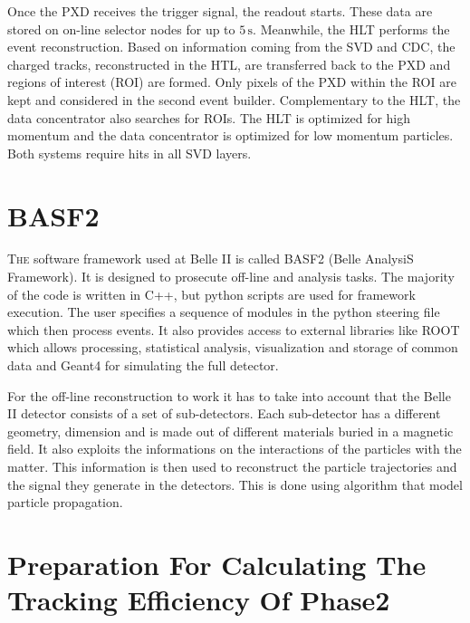 \documentclass[a4paper,11pt,twosided,final,german,openbib,pdftex,listof=totoc,bibliography=totoc]{scrbook}
\begin{document}
Once the PXD receives the trigger signal, the readout starts. These data are stored on on-line selector nodes for up to $5\,\textrm{s}$. Meanwhile, the HLT performs the event reconstruction. Based on information coming from the SVD and CDC, the charged tracks, reconstructed in the HTL, are transferred back to the PXD and regions of interest (ROI) are formed. Only pixels of the PXD within the ROI are kept and considered in the second event builder. Complementary to the HLT, the data concentrator also searches for ROIs. The HLT is optimized for high momentum and the data concentrator is optimized for low momentum particles. Both systems require hits in all SVD layers. \cite{B2TR}





\chapter{BASF2}
\label{sec:Tools}

\lettrine{T}{he} software framework used at Belle II is called BASF2 (Belle AnalysiS Framework). It is designed to prosecute off-line and analysis tasks. The majority of the code is written in C++, but python scripts are used for framework execution. The user specifies a sequence of modules in the python steering file which then process events. It also provides access to external libraries like ROOT which allows processing, statistical analysis, visualization and storage of common data and Geant4 for simulating the full detector.\cite{Moll_2011}


For the off-line reconstruction to work it has to take into account that the Belle II detector consists of a set of sub-detectors. Each sub-detector has a different geometry, dimension and is made out of different materials buried in a magnetic field. It also exploits the informations on the interactions of the particles with the matter. This information is then used to reconstruct the particle trajectories and the signal they generate in the detectors. This is done using algorithm that model particle propagation.








\chapter{Preparation  For Calculating The Tracking Efficiency Of Phase2}
\label{chap:Phase2Eff}
\end{document}
